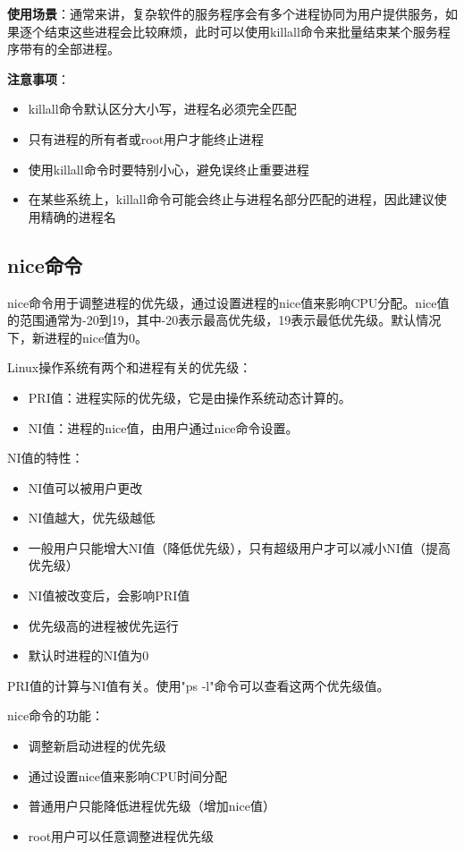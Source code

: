 \documentclass[12pt,UTF8]{ctexbook}
\begin{document}
\textbf{使用场景}：通常来讲，复杂软件的服务程序会有多个进程协同为用户提供服务，如果逐个结束这些进程会比较麻烦，此时可以使用killall命令来批量结束某个服务程序带有的全部进程。

\textbf{注意事项}：
\begin{itemize}
    \item killall命令默认区分大小写，进程名必须完全匹配
    \item 只有进程的所有者或root用户才能终止进程
    \item 使用killall命令时要特别小心，避免误终止重要进程
    \item 在某些系统上，killall命令可能会终止与进程名部分匹配的进程，因此建议使用精确的进程名
\end{itemize}

\subsection{nice命令}
nice命令用于调整进程的优先级，通过设置进程的nice值来影响CPU分配。nice值的范围通常为-20到19，其中-20表示最高优先级，19表示最低优先级。默认情况下，新进程的nice值为0。

Linux操作系统有两个和进程有关的优先级：
\begin{itemize}
    \item PRI值：进程实际的优先级，它是由操作系统动态计算的。
    \item NI值：进程的nice值，由用户通过nice命令设置。
\end{itemize}

NI值的特性：
\begin{itemize}
    \item NI值可以被用户更改
    \item NI值越大，优先级越低
    \item 一般用户只能增大NI值（降低优先级），只有超级用户才可以减小NI值（提高优先级）
    \item NI值被改变后，会影响PRI值
    \item 优先级高的进程被优先运行
    \item 默认时进程的NI值为0
\end{itemize}

PRI值的计算与NI值有关。使用"ps -l"命令可以查看这两个优先级值。

nice命令的功能：
\begin{itemize}
    \item 调整新启动进程的优先级
    \item 通过设置nice值来影响CPU时间分配
    \item 普通用户只能降低进程优先级（增加nice值）
    \item root用户可以任意调整进程优先级
\end{itemize}
\end{document}
